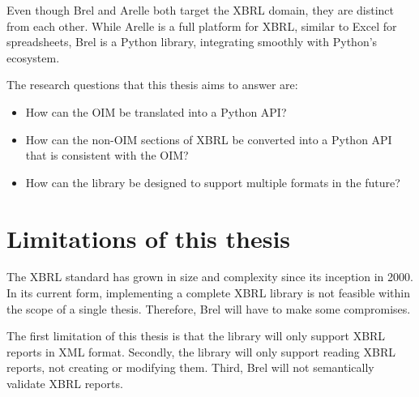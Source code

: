 Even though Brel and Arelle both target the XBRL domain, they are distinct from each other.
While Arelle is a full platform for XBRL, similar to Excel for spreadsheets,  
Brel is a Python library, integrating smoothly with Python's ecosystem.

The research questions that this thesis aims to answer are:


\begin{itemize}
    \item \textbf{} How can the OIM be translated into a Python API?
    \item \textbf{} How can the non-OIM sections of XBRL be converted into a Python API that is consistent with the OIM?
    \item \textbf{} How can the library be designed to support multiple formats in the future?
\end{itemize}

\section{Limitations of this thesis}
\label{sec:limitations}

The XBRL standard has grown in size and complexity since its inception in 2000.
In its current form, implementing a complete XBRL library is not feasible within the scope of a single thesis.
Therefore, Brel will have to make some compromises.

The first limitation of this thesis is that the library will only support XBRL reports in XML format.
Secondly, the library will only support reading XBRL reports, not creating or modifying them.
Third, Brel will not semantically validate XBRL reports.

